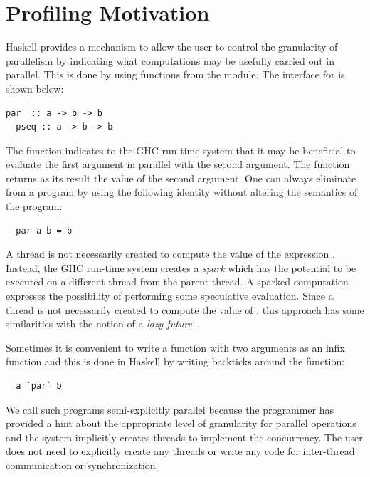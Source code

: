 \section{Profiling Motivation}
Haskell provides a mechanism to allow the user to control the granularity of parallelism by indicating what computations may be usefully carried out in parallel. This is done by using functions from the  module. The interface for  is shown below:
\begin{lstlisting}[columns=flexible]
  par  :: a -> b -> b 
  pseq :: a -> b -> b 
\end{lstlisting}
The function  indicates to the GHC run-time system that it may be beneficial to evaluate the first argument in parallel with the second argument. The  function returns as its result the value of the second argument. One can always eliminate  from a program by using the following identity without altering the semantics of the program:
\begin{lstlisting}
  par a b = b 
\end{lstlisting}
A thread is not necessarily created to compute the value of the expression . Instead, the GHC run-time system creates a {\em spark} which has the potential to be executed on a different thread from the parent thread. A sparked computation expresses the possibility of performing some speculative evaluation. Since a thread is not necessarily created to compute the value of , this approach has some similarities with the notion of a {\em lazy future}~\cite{mohr:91}.

Sometimes it is convenient to write a function with two arguments as an
infix function and this is done in Haskell by writing backticks 
around the function:
\begin{lstlisting}
  a `par` b
\end{lstlisting}

We call such programs semi-explicitly parallel because the programmer has provided a hint about the appropriate level of granularity for parallel operations and the system implicitly creates threads to implement the concurrency. The user does not need to explicitly create any threads or write any code for inter-thread communication or synchronization.

